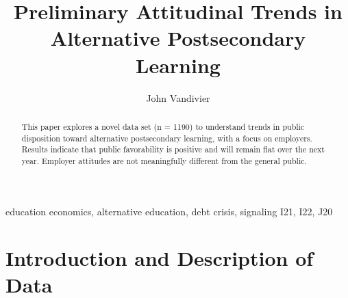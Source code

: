 \documentclass[review]{elsarticle}
\begin{document}
\begin{frontmatter}

\title{
    Preliminary Attitudinal Trends in Alternative Postsecondary Learning
}

\author[mymainaddress]{John Vandivier} %
\address[mymainaddress]{4400 University Dr, Fairfax, VA 22030}




\begin{abstract}
    This paper explores a novel data set (n = 1190) to understand trends in public
    disposition toward alternative postsecondary learning, with a focus on employers.
    Results indicate that public favorability is positive and will remain flat over the next year.
    Employer attitudes are not meaningfully different from the general public.
\end{abstract}

\begin{keyword}
education economics, alternative education, debt crisis, signaling
\MSC[2010] I21, I22, J20 %
\end{keyword}

\end{frontmatter}

\pagebreak
\linenumbers
        
        \section{Introduction and Description of Data}
\end{document}
